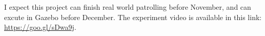 \documentclass[letterpaper, 10 pt, conference]{ieeeconf}  %
\begin{document}
I expect this project can finish real world patrolling before November, and can excute in Gazebo before December. The experiment video is available in this link: \url{https://goo.gl/sDwa9j}.

\addtolength{\textheight}{-12cm}   %



\end{document}
